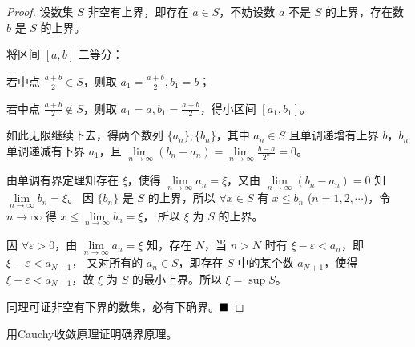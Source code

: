 \begin{proof}
    设数集 $S$ 非空有上界，即存在 $a \in S$，不妨设数 $a$ 不是 $S$ 的上界，存在数 $b$ 是 $S$ 的上界。
    
    将区间 $[a,b]$ 二等分：
    
    若中点 $\frac{a+b}{2} \in S$，则取 $a_1 = \frac{a+b}{2}, b_1 = b$；
    
    若中点 $\frac{a+b}{2} \notin S$，则取 $a_1 = a, b_1 = \frac{a+b}{2}$，得小区间 $[a_1, b_1]$。
    
    如此无限继续下去，得两个数列 $\{a_n\}, \{b_n\}$，其中 $a_n \in S$ 且单调递增有上界 $b$，$b_n$ 单调递减有下界 $a_1$，且 $\lim\limits_{n \to \infty} (b_n - a_n) = \lim\limits_{n \to \infty} \frac{b-a}{2^n} = 0$。
    
    由单调有界定理知存在 $\xi$，使得 $\lim\limits_{n \to \infty} a_n = \xi$，又由 $\lim\limits_{n \to \infty} (b_n - a_n) = 0$ 知 $\lim\limits_{n \to \infty} b_n = \xi$。
    因 $\{b_n\}$ 是 $S$ 的上界，所以 $\forall x \in S$ 有 $x \leq b_n$ ($n=1,2,\cdots$)，令 $n \to \infty$ 得 $x \leq \lim\limits_{n \to \infty} b_n = \xi$，
    所以 $\xi$ 为 $S$ 的上界。
    
    因 $\forall \varepsilon > 0$，由 $\lim\limits_{n \to \infty} a_n = \xi$ 知，存在 $N$，当 $n > N$ 时有 $\xi - \varepsilon < a_n$，即 $\xi - \varepsilon < a_{N+1}$，
    又对所有的 $a_n \in S$，即存在 $S$ 中的某个数 $a_{N+1}$，使得 $\xi - \varepsilon < a_{N+1}$，故 $\xi$ 为 $S$ 的最小上界。所以 $\xi = \sup S$。
    
    同理可证非空有下界的数集，必有下确界。$\hfill\blacksquare$
\end{proof}
    
\begin{problem}
    用Cauchy收敛原理证明确界原理。
\end{problem}

